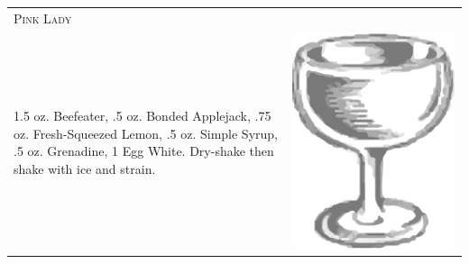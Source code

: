 \documentclass{article}
\begin{document}
\begin{tabular}{p{2in} p{0.5in}}
  \multicolumn{2}{p{3in}}{\centering\Huge\textsc{Pink Lady}} \\ 
   \vspace{-0.1in}1.5 oz. Beefeater, .5 oz. Bonded Applejack, .75 oz. Fresh-Squeezed Lemon, .5 oz. Simple Syrup, .5 oz. Grenadine, 1 Egg White. Dry-shake then shake with ice and strain. &
   \vspace{-0.1in} \includegraphics{coupe.png}
\end{tabular}
\end{document}
